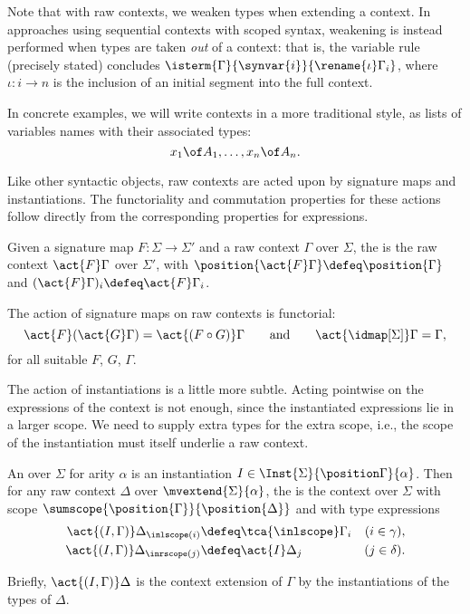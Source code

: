 Note that with raw contexts, we weaken types when extending a context.
%
In approaches using sequential contexts with scoped syntax, weakening is instead performed when types are taken \emph{out} of a context: that is, the variable rule (precisely stated) concludes $\isterm{\Gamma}{\synvar{i}}{\rename{\iota}\Gamma_i}$, where $\iota : i \to n$ is the inclusion of an initial segment into the full context.

In concrete examples, we will write contexts in a more traditional style, as lists of variables names with their associated types:
\[  x_1 \of A_1, \ldots, x_n \of A_n. \]

Like other syntactic objects, raw contexts are acted upon by signature maps and instantiations. The functoriality and commutation properties for these actions follow directly from the corresponding properties for expressions.

\begin{definition}
  Given a signature map $F : \Sigma \to \Sigma'$ and a raw context $\Gamma$ over $\Sigma$, the  is the raw context $\act{F} \Gamma$ over $\Sigma'$, with $\position{\act{F} \Gamma} \defeq \position{\Gamma}$ and $(\act{F}\Gamma)_i \defeq \act{F}\Gamma_i$. 
\end{definition}

\begin{propositionwithqed}
  The action of signature maps on raw contexts is functorial:
  \begin{equation*}
    \act{F}(\act{G} \Gamma) = \act{(F \circ G)}\Gamma
    \qquad\text{and}\qquad
    \act{{\idmap[\Sigma]}} \Gamma = \Gamma,
  \end{equation*}
  for all suitable $F$, $G$, $\Gamma$.
\end{propositionwithqed}

The action of instantiations is a little more subtle.
%
Acting pointwise on the expressions of the context  is not enough, since the instantiated expressions lie in a larger scope.
%
We need to supply extra types for the extra scope, i.e., the scope of the instantiation must itself underlie a raw context.

\begin{definition}
  An  over $\Sigma$ for arity $\alpha$ is an instantiation $I \in \Inst{\Sigma}{\position \Gamma}{\alpha}$.
  Then for any raw context $\Delta$ over $\mvextend{\Sigma}{\alpha}$, the  is the context over $\Sigma$ with scope $\sumscope{\position{\Gamma}}{\position{\Delta}}$ and with type expressions
  \begin{align*}
    \act{(I,\Gamma)}\Delta_{\inlscope(i)} &\defeq \tca{\inlscope}\Gamma_i & (i \in \gamma), \\
    \act{(I,\Gamma)}\Delta_{\inrscope(j)}&\defeq \act{I}\Delta_j & (j \in \delta).
  \end{align*}

  Briefly, $\act{(I,\Gamma)}\Delta$ is the context extension of $\Gamma$ by the instantiations of the types of $\Delta$.
\end{definition}

